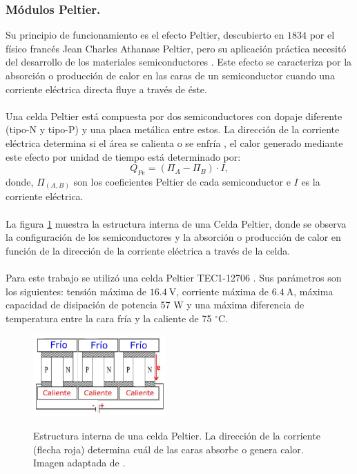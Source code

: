 \subsubsection{Módulos Peltier.}
Su principio de funcionamiento es el efecto Peltier, descubierto en $1834$ por el físico francés Jean Charles Athanase Peltier, pero su aplicación práctica necesitó del desarrollo de los materiales semiconductores \citep{Sandoval2007}. Este efecto se caracteriza por la absorción o producción de calor en las caras de un semiconductor cuando una corriente eléctrica directa fluye a través de éste. \\ \\
Una celda Peltier está compuesta por  dos semiconductores con dopaje diferente (tipo-N y tipo-P) y una placa metálica entre estos. La dirección de la corriente eléctrica determina si el área se calienta o se enfría \citep{peltier_theory}, el calor generado mediante este efecto por unidad de tiempo está determinado por:
\begin{equation}
Q_{Pe}=(\Pi_{A}-\Pi_{B})\cdot I,
\label{peltier_eq}
\end{equation}
donde, $\Pi_{(A,B)}$ son los coeficientes Peltier de cada semiconductor e $I$ es la corriente eléctrica.\\ \\
La figura \ref{fig:celda} muestra la estructura interna de una Celda Peltier, donde se observa la configuración de los semiconductores y la absorción o producción de calor en función de la dirección de la corriente eléctrica a través de la celda.\\ \\
Para este trabajo se utilizó una celda Peltier TEC1-12706 \citep{datasheet_Peltier}. Sus parámetros son los siguientes: tensión máxima de $16.4~\mbox{V}$, corriente máxima de $6.4~\mbox{A}$, máxima capacidad de disipación de potencia 57 W y una máxima diferencia de temperatura entre la cara fría y la caliente de 75 $^\circ \mbox{C}$.

\begin{figure}[h!]
\begin{centering}
    \caption{Estructura interna de una celda Peltier. La dirección de la corriente (flecha roja) determina cuál de las caras absorbe o genera calor. Imagen adaptada de \citep{tesis_caract_SIPM}.}
    \includegraphics[width=0.45\textwidth]{Images/celda.JPG}
    \label{fig:celda}
  \par\end{centering}
\end{figure}

